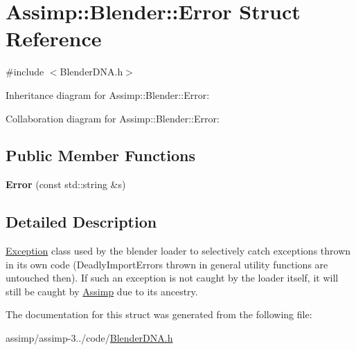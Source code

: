 \hypertarget{struct_assimp_1_1_blender_1_1_error}{\section{Assimp\+:\+:Blender\+:\+:Error Struct Reference}
\label{struct_assimp_1_1_blender_1_1_error}
}


{\ttfamily \#include $<$Blender\+D\+N\+A.\+h$>$}



Inheritance diagram for Assimp\+:\+:Blender\+:\+:Error\+:


Collaboration diagram for Assimp\+:\+:Blender\+:\+:Error\+:
\subsection*{Public Member Functions}
\begin{DoxyCompactItemize}
\item 
\hypertarget{struct_assimp_1_1_blender_1_1_error_aa1a71bcbad4e05d3c0fdff9363106191}{{\bfseries Error} (const std\+::string \&s)}\label{struct_assimp_1_1_blender_1_1_error_aa1a71bcbad4e05d3c0fdff9363106191}

\end{DoxyCompactItemize}


\subsection{Detailed Description}
\hyperlink{class_exception}{Exception} class used by the blender loader to selectively catch exceptions thrown in its own code (Deadly\+Import\+Errors thrown in general utility functions are untouched then). If such an exception is not caught by the loader itself, it will still be caught by \hyperlink{class_assimp}{Assimp} due to its ancestry. 

The documentation for this struct was generated from the following file\+:\begin{DoxyCompactItemize}
\item 
assimp/assimp-\/3../code/\hyperlink{_blender_d_n_a_8h}{Blender\+D\+N\+A.\+h}\end{DoxyCompactItemize}
